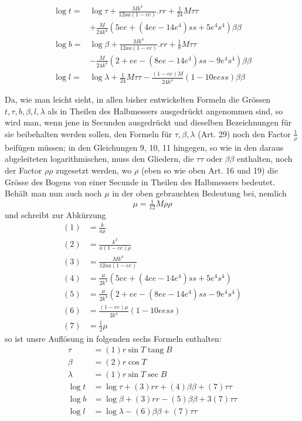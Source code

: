 %
\[
\begin{aligned}
\log t={}&\log\tau+\frac{Mk^4}{12aa(1-ee)}\mathord{.}rr+\tfrac1{24}M\tau\tau\\
&+\frac M{24k^4}(5ee+(4ee-14e^4)ss+5e^4s^4)\beta\beta\\
\log b={}&\log\beta+\frac{Mk^4}{12aa(1-ee)}\mathord{.}rr+\tfrac18M\tau\tau\\
&-\frac M{24k^4}(2+ee-(8ee-14e^4)ss-9e^4s^4)\beta\beta\\
\log l={}&\log\lambda+\tfrac1{24}M\tau\tau-\frac{(1-ee)M}{24k^4}(1-10eess)\beta\beta
\end{aligned}
\]

Da, wie man leicht sieht, in allen bisher entwickelten Formeln die Grössen \(t,\tau,b,\beta,l,\lambda\) als in Theilen des Halbmessers ausgedrückt angenommen sind, so wird man, wenn jene in Secunden ausgedrückt und dieselben Bezeichnungen für sie beibehalten werden sollen, den Formeln für \(\tau,\beta,\lambda\) (Art. 29) noch den Factor \(\frac1\rho\) beifügen müssen; in den Gleichungen 9, 10, 11 hingegen, so wie in den daraus abgeleiteten logarithmischen, muss den Gliedern, die \(\tau\tau\) oder \(\beta\beta\) enthalten, noch der Factor \(\rho\rho\) zugesetzt werden, wo \(\rho\) (eben so wie oben Art. 16 und 19) die Grösse des Bogens von einer Secunde in Theilen des Halbmessers bedeutet. Behält man nun auch noch \(\mu\) in der oben gebrauchten Bedeutung bei, nemlich
\[
\mu=\tfrac1{12}M\rho\rho
\]
und schreibt zur Abkürzung
\[
\begin{aligned}
(1)&=\frac{k}{a\rho}\\
(2)&=\frac{k^3}{a(1-ee)\rho}\\
(3)&=\frac{Mk^4}{12aa(1-ee)}\\
(4)&=\frac{\mu}{2k^4}(5ee+(4ee-14e^4)ss+5e^4s^4)\\
(5)&=\frac{\mu}{2k^4}(2+ee-(8ee-14e^4)ss-9e^4s^4)\\
(6)&=\frac{(1-ee)\mu}{2k^4}(1-10eess)\\
(7)&=\tfrac12\mu
\end{aligned}
\]
so ist unsre Auflösung in folgenden sechs Formeln enthalten:
\[
\begin{aligned}
\tau&=(1)r\sin T\operatorname{tang}B\\
\beta&=(2)r\cos T\\
\lambda&=(1)r\sin T\sec B\\
\log t&=\log\tau+(3)rr+(4)\beta\beta+(7)\tau\tau\\
\log b&=\log\beta+(3)rr-(5)\beta\beta+3(7)\tau\tau\\
\log l&=\log\lambda-(6)\beta\beta+(7)\tau\tau
\end{aligned}
\]
